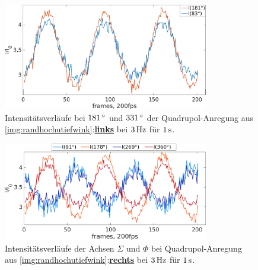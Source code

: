 \documentclass[numbers=noenddot,a4paper]{scrartcl}
\newcommand{\degree}{^\circ}
\newcommand{\fett}[1]{\textbf{#1}}
\begin{document}
						\begin{figure}[!t]
							\centering
							\includegraphics[width=0.8\textwidth,height=0.4\textwidth]{figs/auswertung/intens83u180quadinphase3Hz1sek.png}
							\caption{Intensitätsverläufe bei $\unit[181]{\degree}$  und $\unit[331]{\degree}$ der Quadrupol-Anregung aus \ref{img:randhochutiefwink}:\underline{\fett{links}} bei $\unit[3]{Hz}$ für $\unit[1]{s}$. }
							\label{img:intensquad180u83}
						\end{figure}

						\begin{figure}[!b]
							\centering
							\includegraphics[width=0.8\textwidth,height=0.45\textwidth]{figs/auswertung/intensquad91269u1782603Hz1sek.png}
							\caption{Intensitätsverläufe der Achsen $\Sigma$ und $\Phi$ bei Quadrupol-Anregung aus \ref{img:randhochutiefwink}:\underline{\fett{rechts}} bei $\unit[3]{Hz}$ für $\unit[1]{s}$. }
							\label{img:intensquadalles}
						\end{figure}
\end{document}
